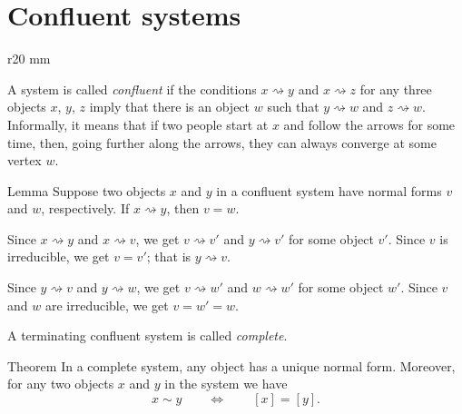 \section{Confluent systems}

\begin{wrapfigure}{r}{20 mm}
\vskip-0mm
\centering
{}
\vskip-0mm
\end{wrapfigure}

A system is called \emph{confluent} if the conditions $x\rightsquigarrow  y$ and $x\rightsquigarrow  z$
for any three objects $x$, $y$, $z$ imply that
there is an object $w$ such that $y\rightsquigarrow  w$ and $z\rightsquigarrow  w$.
Informally, it means that if two people start at $x$ and follow the arrows for some time,
then, going further along the arrows, they can always converge at some vertex $w$.


\begin{thm}{Lemma}\label{lem:x->y}
Suppose two objects $x$ and $y$ in a confluent system have normal forms 
$v$ and $w$, respectively.
If $x\rightsquigarrow y$, then $v=w$.
\end{thm}

Since $x\rightsquigarrow y$ and $x\rightsquigarrow v$, we get $v\rightsquigarrow v'$ and $y\rightsquigarrow v'$ for some object $v'$.
Since $v$ is irreducible, we get $v=v'$;
that is $y\rightsquigarrow v$.

Since $y\rightsquigarrow v$ and $y\rightsquigarrow w$, we get $v\rightsquigarrow w'$ and $w\rightsquigarrow w'$ for some object $w'$.
Since $v$ and $w$ are irreducible, we get $v=w'=w$.
\qeds

A terminating confluent system is called \emph{complete}.

\begin{thm}{Theorem}
In a complete system, any object has a unique normal form.
Moreover, for any two objects $x$ and $y$ in the system we have
\[x\sim y\qquad\Longleftrightarrow\qquad [x]=[y].\]

\end{thm}

